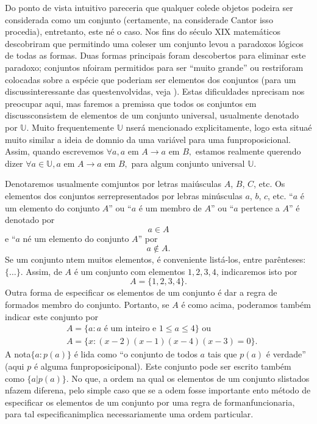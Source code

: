 Do ponto de vista intuitivo pareceria que qualquer cole\cao de objetos podeira ser considerada como um conjunto (certamente, na considera\cao de Cantor isso procedia), entretanto, este n\ao \'e o caso. Nos fins do s\'eculo XIX matem\'aticos descobriram que permitindo uma cole\cao ser um conjunto levou a paradoxos l\'ogicos de todas as formas. Duas formas principais foram descobertos para eliminar este paradoxo; conjuntos n\ao foiram permitidos para ser ``muito grande'' ou restri\coes foram  colocadas sobre a esp\'ecie que poderiam ser elementos dos conjuntos (para um discuss\ao interessante das quest\oes envolvidas, veja \cite{pinter:1971}). Estas dificuldades n\ao precisam nos preocupar aqui, mas faremos a premissa que todos os conjuntos em discuss\ao consistem de elementos de um conjunto universal, usualmente denotado por $\mathbb{U}$. Muito frequentemente $\mathbb{U}$ n\ao ser\'a  mencionado explicitamente, logo esta situa\cao \'e muito similar a ideia de dom\ih nio da uma vari\'avel para uma fun\cao proposicional. Assim, quando escrevemos $\forall a, a \textrm{ em } A\to a \textrm{ em } B,$ estamos realmente querendo dizer $\forall a\in\mathbb{U}, a \textrm{ em } A\to a \textrm{ em } B,$ para algum conjunto universal $\mathbb{U}$. 

Denotaremos usualmente comjuntos por letras mai\'usculas $A$, $B$, $C$, etc. Os elementos dos conjuntos ser\ao representados por lebras min\'usculas $a$, $b$, $c$, etc. ``$a$ \'e um elemento do conjunto $A$'' ou ``$a$ \'e um membro de $A$'' ou ``$a$ pertence a $A$'' \'e denotado por
\[
a\in A
\]
e ``$a$ n\ao \'e um elemento do conjunto $A$'' por
\[
a\notin A.
\]
Se um conjunto n\ao tem muitos elementos, \'e conveniente list\'a-los, entre par\^enteses: $\{\ldots\}$. Assim, de $A$ \'e um conjunto com elementos $1,2,3,4$, indicaremos isto por
\[
A=\{1,2,3,4\}.
\]
Outra forma de especificar os elementos de um conjunto \'e dar a regra de forma\cao dos membro do conjunto. Portanto, se $A$ \'e como acima, poder\ih amos tamb\'em indicar este conjunto por
\begin{eqnarray*}
& A = \{a: a \textrm{ \'e um inteiro e } 1\leq a \leq 4\} \textrm{ ou }\\
& A = \{x: (x-2)(x-1)(x-4)(x-3)=0\}.
\end{eqnarray*}
A nota\cao $\{a:p(a)\}$ \'e lida como ``o conjunto de todos $a$ tais que $p(a)$ \'e verdade'' (aqui $p$ \'e alguma fun\cao proposiciponal). Este conjunto pode ser escrito tamb\'em como $\{a|p(a)\}$. No que, a ordem na qual os elementos de um conjunto s\ao listados n\ao fazem diferen\cc a, pelo simple caso que se a odem fosse importante ent\ao o m\'etodo de especificar os elementos de um conjunto  por uma regra de forma\cao n\ao funcionaria, para tal especifica\cao n\ao implica necessariamente uma ordem particular.

